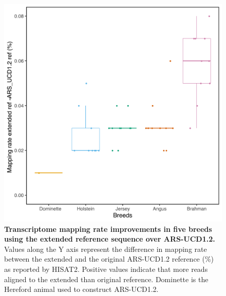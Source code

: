 \documentclass[../main.tex]{subfiles}
\begin{document}
\begin{flushleft}
\begin{figure}[!htb]
    \centering
    \includegraphics[width=\textwidth]{paper3/supplement/sp49.pdf}
    \caption[Transcriptome mapping improvement in the pangenome]{\textbf{Transcriptome mapping rate improvements in five breeds using the extended reference sequence over ARS-UCD1.2. } \\
    \small{Values along the Y axis represent the difference in mapping rate between the extended and the original ARS-UCD1.2 reference (\%) as reported by HISAT2. Positive values indicate that more reads aligned to the extended than original reference. Dominette is the Hereford animal used to construct ARS-UCD1.2.}}
    \label{sup_fig:s49}
\end{figure}

\newpage


\end{flushleft}
\end{document}
